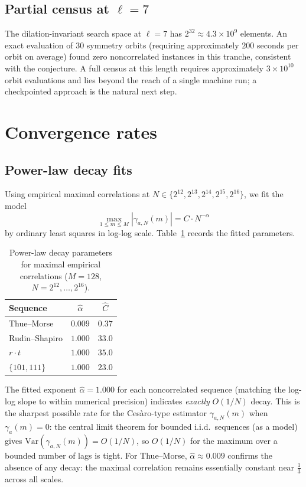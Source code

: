 \documentclass[11pt]{article}
\theoremstyle{definition}
\begin{document}
\subsection{Partial census at $\ell = 7$}
\label{subsec:ell7}

The dilation-invariant search space at $\ell = 7$ has $2^{32} \approx 4.3
\times 10^9$ elements. An exact evaluation of $30$ symmetry orbits
(requiring approximately $200$ seconds per orbit on average) found zero
noncorrelated instances in this tranche, consistent with the
conjecture. A full census at this length requires approximately $3
\times 10^{10}$ orbit evaluations and lies beyond the reach of a single
machine run; a checkpointed approach is the natural next step.

\section{Convergence rates}
\label{sec:convergence}

\subsection{Power-law decay fits}

Using empirical maximal correlations at $N \in \{2^{12}, 2^{13},
2^{14}, 2^{15}, 2^{16}\}$, we fit the model
\[
    \max_{1 \leq m \leq M} |\gamma_{a,N}(m)| = C \cdot N^{-\alpha}
\]
by ordinary least squares in log-log scale.
Table~\ref{tab:decay} records the fitted parameters.

\begin{table}[ht]
\centering
\caption{Power-law decay parameters for maximal empirical correlations
         ($M = 128$, $N = 2^{12},\ldots,2^{16}$).}
\label{tab:decay}
\begin{tabular}{lcc}
\toprule
Sequence & $\hat{\alpha}$ & $\hat{C}$ \\
\midrule
Thue--Morse      & $0.009$ & $0.37$ \\
Rudin--Shapiro   & $1.000$ & $33.0$ \\
$r \cdot t$      & $1.000$ & $35.0$ \\
$\{101, 111\}$   & $1.000$ & $23.0$ \\
\bottomrule
\end{tabular}
\end{table}

The fitted exponent $\hat\alpha = 1.000$ for each noncorrelated sequence
(matching the log-log slope to within numerical precision) indicates
\emph{exactly} $O(1/N)$ decay. This is the sharpest possible rate for
the Ces\`{a}ro-type estimator $\gamma_{a,N}(m)$ when $\gamma_a(m) = 0$:
the central limit theorem for bounded i.i.d.\ sequences (as a
model) gives $\mathrm{Var}(\gamma_{a,N}(m)) = O(1/N)$, so $O(1/N)$
for the maximum over a bounded number of lags is tight. For
Thue--Morse, $\hat\alpha \approx 0.009$ confirms the absence of any
decay: the maximal correlation remains essentially constant near
$\tfrac{1}{3}$ across all scales.
\end{document}
